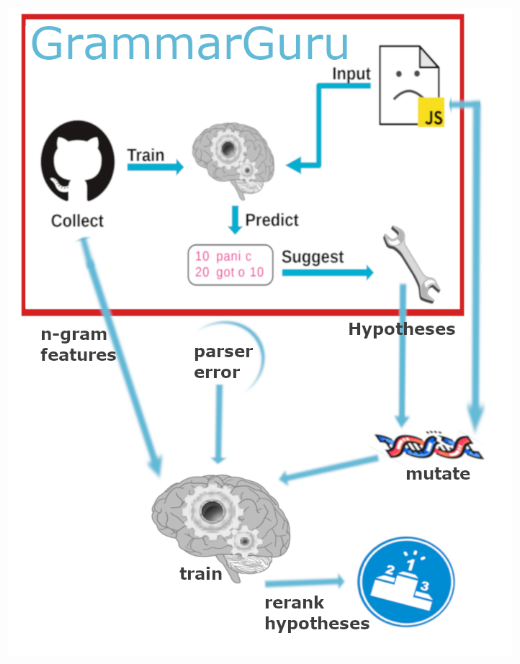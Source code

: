 \documentclass[a0,portrait]{a0poster}
\begin{document}
\begin{multicols}{2}
\color{Navy}
\begin{center}
\includegraphics[width=0.8\linewidth]{proj_img}
\end{center}



\end{multicols}
\end{document}
